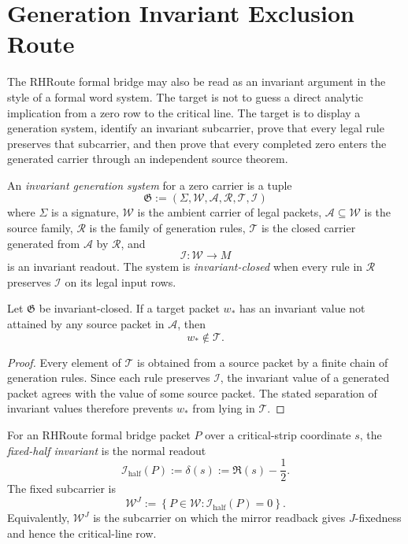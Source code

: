 \section{Generation Invariant Exclusion Route}
\label{sec:unified-reality-generation-invariant-exclusion-route}

The RHRoute formal bridge may also be read as an invariant argument in
the style of a formal word system.  The target is not to guess a direct
analytic implication from a zero row to the critical line.  The target is
to display a generation system, identify an invariant subcarrier, prove
that every legal rule preserves that subcarrier, and then prove that
every completed zero enters the generated carrier through an independent
source theorem.

\begin{definition}
\label{def:unified-reality-invariant-generation-system}
An \emph{invariant generation system} for a zero carrier is a tuple
$$
\mathfrak G
:=
\left(
\Sigma,
\mathcal W,
\mathcal A,
\mathcal R,
\mathcal T,
\mathcal I
\right)
$$
where $\Sigma$ is a signature, $\mathcal W$ is the ambient carrier of
legal packets, $\mathcal A\subseteq\mathcal W$ is the source family,
$\mathcal R$ is the family of generation rules, $\mathcal T$ is the
closed carrier generated from $\mathcal A$ by $\mathcal R$, and
$$
\mathcal I:\mathcal W\to M
$$
is an invariant readout.  The system is \emph{invariant-closed} when
every rule in $\mathcal R$ preserves $\mathcal I$ on its legal input
rows.
\end{definition}

\begin{theorem}
\label{thm:unified-reality-invariant-exclusion}
Let $\mathfrak G$ be invariant-closed.  If a target packet $w_\ast$ has
an invariant value not attained by any source packet in $\mathcal A$,
then
$$
w_\ast\notin\mathcal T.
$$
\end{theorem}

\begin{proof}
Every element of $\mathcal T$ is obtained from a source packet by a
finite chain of generation rules.  Since each rule preserves
$\mathcal I$, the invariant value of a generated packet agrees with the
value of some source packet.  The stated separation of invariant values
therefore prevents $w_\ast$ from lying in $\mathcal T$.
\end{proof}

\begin{definition}
\label{def:unified-reality-fixed-half-invariant-rhroute-packets}
For an RHRoute formal bridge packet $P$ over a critical-strip coordinate
$s$, the \emph{fixed-half invariant} is the normal readout
$$
\mathcal I_{\mathrm{half}}(P)
:=
\delta(s)
:=
\Re(s)-\frac12.
$$
The fixed subcarrier is
$$
\mathcal W^{J}
:=
\left\{
P\in\mathcal W:
\mathcal I_{\mathrm{half}}(P)=0
\right\}.
$$
Equivalently, $\mathcal W^J$ is the subcarrier on which the mirror
readback gives $J$-fixedness and hence the critical-line row.
\end{definition}

